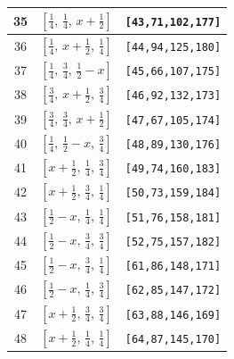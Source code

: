 \documentclass[fleqn,8pt]{jsarticle}
\begin{document}
\begin{longtable}{ccc}
35 & $\left[ \frac{1}{4},\, \frac{1}{4},\, x + \frac{1}{2} \right]$ & {\tt [43,71,102,177]} \\ \hline
36 & $\left[ \frac{1}{4},\, x + \frac{1}{2},\, \frac{1}{4} \right]$ & {\tt [44,94,125,180]} \\ \hline
37 & $\left[ \frac{1}{4},\, \frac{3}{4},\, \frac{1}{2} - x \right]$ & {\tt [45,66,107,175]} \\ \hline
38 & $\left[ \frac{3}{4},\, x + \frac{1}{2},\, \frac{3}{4} \right]$ & {\tt [46,92,132,173]} \\ \hline
39 & $\left[ \frac{3}{4},\, \frac{3}{4},\, x + \frac{1}{2} \right]$ & {\tt [47,67,105,174]} \\ \hline
40 & $\left[ \frac{1}{4},\, \frac{1}{2} - x,\, \frac{3}{4} \right]$ & {\tt [48,89,130,176]} \\ \hline
41 & $\left[ x + \frac{1}{2},\, \frac{1}{4},\, \frac{3}{4} \right]$ & {\tt [49,74,160,183]} \\ \hline
42 & $\left[ x + \frac{1}{2},\, \frac{3}{4},\, \frac{1}{4} \right]$ & {\tt [50,73,159,184]} \\ \hline
43 & $\left[ \frac{1}{2} - x,\, \frac{1}{4},\, \frac{1}{4} \right]$ & {\tt [51,76,158,181]} \\ \hline
44 & $\left[ \frac{1}{2} - x,\, \frac{3}{4},\, \frac{3}{4} \right]$ & {\tt [52,75,157,182]} \\ \hline
45 & $\left[ \frac{1}{2} - x,\, \frac{3}{4},\, \frac{1}{4} \right]$ & {\tt [61,86,148,171]} \\ \hline
46 & $\left[ \frac{1}{2} - x,\, \frac{1}{4},\, \frac{3}{4} \right]$ & {\tt [62,85,147,172]} \\ \hline
47 & $\left[ x + \frac{1}{2},\, \frac{3}{4},\, \frac{3}{4} \right]$ & {\tt [63,88,146,169]} \\ \hline
48 & $\left[ x + \frac{1}{2},\, \frac{1}{4},\, \frac{1}{4} \right]$ & {\tt [64,87,145,170]} \\
\end{longtable}
\renewcommand{\arraystretch}{1.2}
\end{document}
